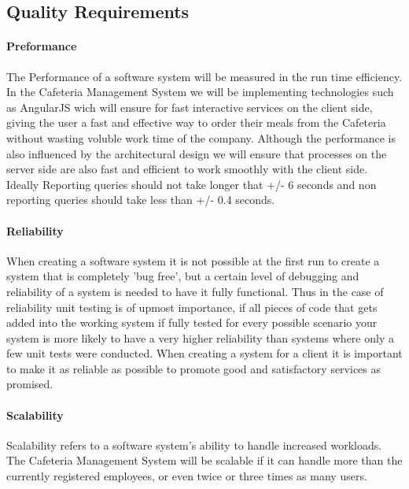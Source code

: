 \documentclass[12pt]{article}
\begin{document}
\subsection{Quality Requirements}

\paragraph{ Preformance\\}
The Performance of a software system will be measured in the run time efficiency.  In the Cafeteria Management System we will be implementing technologies such as AngularJS wich will ensure for fast interactive services on the client side, giving the user a fast and effective way to order their meals from the Cafeteria without wasting voluble work time of the company.  Although the performance is also influenced by the architectural design we will ensure that processes on the server side are also fast and efficient to work smoothly with the client side. Ideally Reporting queries should not take longer that +/- 6 seconds and non reporting queries should take less than +/- 0.4 seconds. 

\paragraph{ Reliability\\}
When creating a software system it is not possible at the first run to create a system that is completely 'bug free', but a certain level of debugging and reliability of a system is needed to have it fully functional. Thus in the case of reliability unit testing is of upmost importance, if all pieces of code that gets added into the working system if fully tested for every possible scenario your system is more likely to have a very higher reliability than systems where only a few unit tests were conducted. When creating a system for a client it is important to make it as reliable as possible to promote good and satisfactory services as promised.

\paragraph{Scalability\\}
Scalability refers to a software system's ability to handle increased workloads. The Cafeteria Management System will be scalable if it can handle more than the currently registered employees, or even twice or three times  as many users.  
\end{document}
